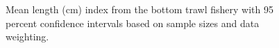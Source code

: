 \documentclass[
]{scrartcl}
\begin{document}
\begin{figure}[H]


\caption{\label{fig-meanlt-bt}Mean length (cm) index from the bottom
trawl fishery with 95 percent confidence intervals based on sample sizes
and data weighting.}

\end{figure}%
\end{document}
